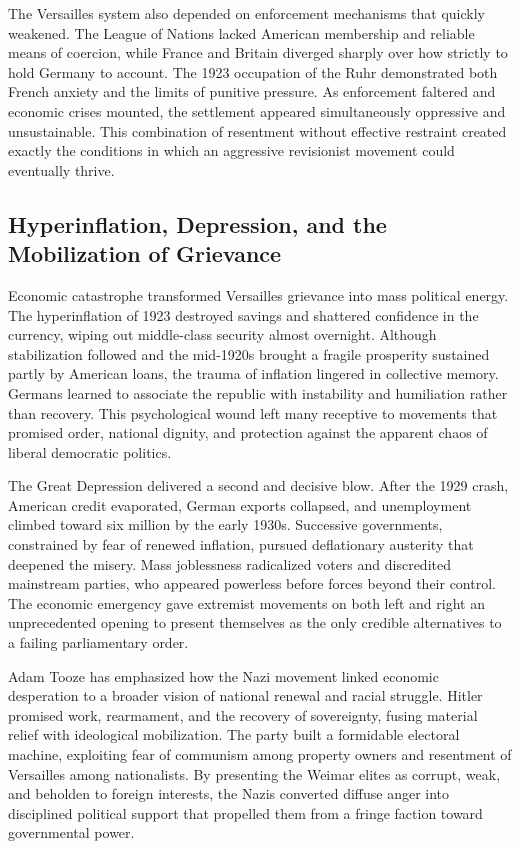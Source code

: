 The Versailles system also depended on enforcement mechanisms that quickly weakened. The League of Nations lacked American membership and reliable means of coercion, while France and Britain diverged sharply over how strictly to hold Germany to account. The 1923 occupation of the Ruhr demonstrated both French anxiety and the limits of punitive pressure. As enforcement faltered and economic crises mounted, the settlement appeared simultaneously oppressive and unsustainable. This combination of resentment without effective restraint created exactly the conditions in which an aggressive revisionist movement could eventually thrive. \cite{taylor1961} \cite{weinberg1994} \cite{kershaw2000}

\subsection{Hyperinflation, Depression, and the Mobilization of Grievance}
Economic catastrophe transformed Versailles grievance into mass political energy. The hyperinflation of 1923 destroyed savings and shattered confidence in the currency, wiping out middle-class security almost overnight. Although stabilization followed and the mid-1920s brought a fragile prosperity sustained partly by American loans, the trauma of inflation lingered in collective memory. Germans learned to associate the republic with instability and humiliation rather than recovery. This psychological wound left many receptive to movements that promised order, national dignity, and protection against the apparent chaos of liberal democratic politics.

The Great Depression delivered a second and decisive blow. After the 1929 crash, American credit evaporated, German exports collapsed, and unemployment climbed toward six million by the early 1930s. Successive governments, constrained by fear of renewed inflation, pursued deflationary austerity that deepened the misery. Mass joblessness radicalized voters and discredited mainstream parties, who appeared powerless before forces beyond their control. The economic emergency gave extremist movements on both left and right an unprecedented opening to present themselves as the only credible alternatives to a failing parliamentary order.

Adam Tooze has emphasized how the Nazi movement linked economic desperation to a broader vision of national renewal and racial struggle. Hitler promised work, rearmament, and the recovery of sovereignty, fusing material relief with ideological mobilization. The party built a formidable electoral machine, exploiting fear of communism among property owners and resentment of Versailles among nationalists. By presenting the Weimar elites as corrupt, weak, and beholden to foreign interests, the Nazis converted diffuse anger into disciplined political support that propelled them from a fringe faction toward governmental power.

